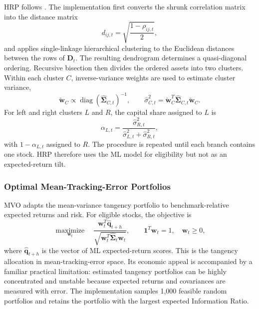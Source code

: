 \documentclass[preprint,12pt,authoryear]{elsarticle}
\begin{document}
\begin{appendices}
HRP follows \citet{lopezdeprado2016}. The implementation first converts the shrunk correlation matrix into the distance matrix
\begin{equation}
d_{ij,t}=\sqrt{\frac{1-\rho_{ij,t}}{2}},
\end{equation}
and applies single-linkage hierarchical clustering to the Euclidean distances between the rows of $\mathbf{D}_{t}$. The resulting dendrogram determines a quasi-diagonal ordering. Recursive bisection then divides the ordered assets into two clusters. Within each cluster $C$, inverse-variance weights are used to estimate cluster variance,
\begin{equation}
\widetilde{\mathbf{w}}_{C}\propto
\operatorname{diag}\left(\widehat{\boldsymbol{\Sigma}}_{C,t}\right)^{-1},
\qquad
\widehat{\sigma}^{2}_{C,t}=
\widetilde{\mathbf{w}}_{C}^{T}
\widehat{\boldsymbol{\Sigma}}_{C,t}
\widetilde{\mathbf{w}}_{C}.
\end{equation}
For left and right clusters $L$ and $R$, the capital share assigned to $L$ is
\begin{equation}
\alpha_{L,t}=
\frac{\widehat{\sigma}^{2}_{R,t}}
{\widehat{\sigma}^{2}_{L,t}+\widehat{\sigma}^{2}_{R,t}},
\end{equation}
with $1-\alpha_{L,t}$ assigned to $R$. The procedure is repeated until each branch contains one stock. HRP therefore uses the ML model for eligibility but not as an expected-return tilt.

\subsubsection{Optimal Mean-Tracking-Error Portfolios}

MVO adapts the mean-variance tangency portfolio to benchmark-relative expected returns and risk. For eligible stocks, the objective is
\begin{equation}
\underset{\mathbf{w}_{t}}{\operatorname{maximize}}\quad
\frac{\mathbf{w}_{t}^{T}\widehat{\mathbf{q}}_{t+h}}
{\sqrt{\mathbf{w}_{t}^{T}
\widehat{\boldsymbol{\Sigma}}_{t}\mathbf{w}_{t}}},
\qquad
\mathbf{1}^{T}\mathbf{w}_{t}=1,\quad \mathbf{w}_{t}\geq0,
\end{equation}
where $\widehat{\mathbf{q}}_{t+h}$ is the vector of ML expected-return scores. This is the tangency allocation in mean-tracking-error space. Its economic appeal is accompanied by a familiar practical limitation: estimated tangency portfolios can be highly concentrated and unstable because expected returns and covariances are measured with error. The implementation samples 1,000 feasible random portfolios and retains the portfolio with the largest expected Information Ratio.


\end{appendices}
\end{document}
